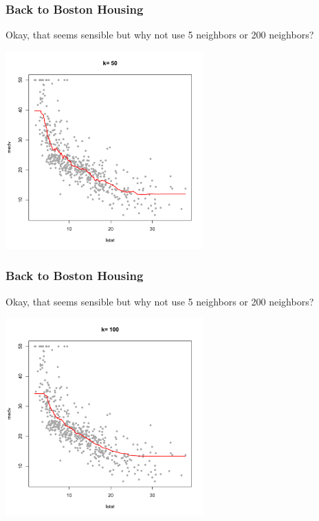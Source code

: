 \documentclass[flegn]{beamer}
\begin{document}
\begin{frame}
\frametitle{Back to Boston Housing}
{\color{blue}Okay, that seems sensible but why not use 5 neighbors or 200 neighbors? }

\vspace{-0.5cm}
\begin{center}
\includegraphics[width=3in]{k50}
\end{center}
\end{frame}

\begin{frame}
\frametitle{Back to Boston Housing}
{\color{blue}Okay, that seems sensible but why not use 5 neighbors or 200 neighbors? }

\vspace{-0.5cm}
\begin{center}
\includegraphics[width=3in]{k100}
\end{center}
\end{frame}
\end{document}
